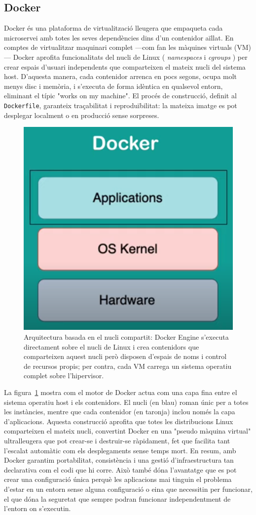 \subsection*{Docker}

Docker és una plataforma de virtualització lleugera que empaqueta cada microservei amb totes les seves dependències dins d'un contenidor aïllat.  
En comptes de virtualitzar maquinari complet —com fan les màquines virtuals (VM)— Docker aprofita funcionalitats del nucli de Linux ( \emph{namespaces} i \emph{cgroups} ) per crear espais d'usuari independents que comparteixen el mateix nucli del sistema host.  
D'aquesta manera, cada contenidor arrenca en pocs segons, ocupa molt menys disc i memòria, i s'executa de forma idèntica en qualsevol entorn, eliminant el típic "works on my machine".  
El procés de construcció, definit al \texttt{Dockerfile}, garanteix traçabilitat i reproduïbilitat: la mateixa imatge es pot desplegar localment o en producció sense sorpreses.

\begin{figure}[H]
  \centering
  \includegraphics[width=0.45\linewidth]{Figures/117345_64a37d970df643f3a3d634fbb71c91a8~mv2.png}
  \caption{Arquitectura basada en el nucli compartit: Docker Engine s'executa directament sobre el nucli de Linux i crea contenidors que comparteixen aquest nucli però disposen d'espais de noms i control de recursos propis; per contra, cada VM carrega un sistema operatiu complet sobre l'hipervisor.}
  \label{fig:docker-arch}
\end{figure}

La figura~\ref{fig:docker-arch} mostra com el motor de Docker actua com una capa fina entre el sistema operatiu host i els contenidors.  
El nucli (en blau) roman únic per a totes les instàncies, mentre que cada contenidor (en taronja) inclou només la capa d'aplicacions.  
Aquesta construcció aprofita que totes les distribucions Linux comparteixen el mateix nucli, convertint Docker en una "pseudo màquina virtual" ultralleugera que pot crear-se i destruir-se ràpidament, fet que facilita tant l'escalat automàtic com els desplegaments sense temps mort.  
En resum, amb Docker garantim portabilitat, consistència i una gestió d'infraestructura tan declarativa com el codi que hi corre. Això també dóna l'avantatge que es pot crear una configuració única perquè les aplicacions mai tinguin el problema d'estar en un entorn sense alguna configuració o eina que necessitin per funcionar, el que dóna la seguretat que sempre podran funcionar independentment de l'entorn on s'executin.

